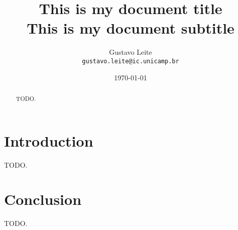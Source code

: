 \documentclass[12pt,a4paper]{article}
\title{This is my document title \\ \large This is my document subtitle}
\author{Gustavo Leite \\ \texttt{gustavo.leite@ic.unicamp.br}}
\date{\today}
\def \TODO {{\color{red}TODO.}}
\begin{document}
\maketitle


\begin{abstract}
  \TODO
\end{abstract}


\section{Introduction}

\TODO

\section{Conclusion} \label{sec:conclusion}

\TODO


\newpage
\singlespacing

\nocite{*} %


\end{document}
